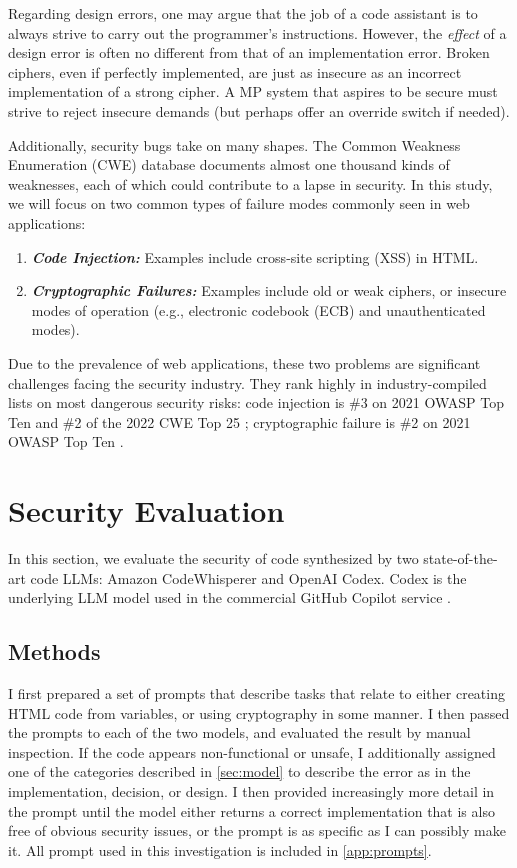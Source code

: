 \documentclass[sigplan,screen,nonacm]{acmart}
\begin{document}
Regarding design errors, one may argue that the job of a code assistant is to always strive to carry out the programmer's instructions. However, the \emph{effect} of a design error is often no different from that of an implementation error. Broken ciphers, even if perfectly implemented, are just as insecure as an incorrect implementation of a strong cipher. A MP system that aspires to be secure must strive to reject insecure demands (but perhaps offer an override switch if needed).

Additionally, security bugs take on many shapes. The Common Weakness Enumeration (CWE) database \cite{cwe} documents almost one thousand kinds of weaknesses, each of which could contribute to a lapse in security. In this study, we will focus on two common types of failure modes commonly seen in web applications:
\begin{enumerate}
    \item \textbf{\textit{Code Injection:}} Examples include cross-site scripting (XSS) in HTML.
    \item \textbf{\textit{Cryptographic Failures:}} Examples include old or weak ciphers, or insecure modes of operation (e.g., electronic codebook (ECB) and unauthenticated modes).
\end{enumerate}
Due to the prevalence of web applications, these two problems are significant challenges facing the security industry. They rank highly in industry-compiled lists on most dangerous security risks: code injection is \#3 on 2021 OWASP Top Ten \cite{owasp-top10} and \#2 of the 2022 CWE Top 25 \cite{cwe-top25}; cryptographic failure is \#2 on 2021 OWASP Top Ten \cite{owasp-top10}.

\section{Security Evaluation} \label{sec:eval}

In this section, we evaluate the security of code synthesized by two state-of-the-art code LLMs: Amazon Code\-Whis\-per\-er and Open\-AI Codex. Codex is the underlying LLM model used in the commercial Git\-Hub Copilot service \cite{copilot-announce}.

\subsection{Methods}

I first prepared a set of prompts that describe tasks that relate to either creating HTML code from variables, or using cryptography in some manner. I then passed the prompts to each of the two models, and evaluated the result by manual inspection. If the code appears non-functional or unsafe, I additionally assigned one of the categories described in \cref{sec:model} to describe the error as in the implementation, decision, or design. I then provided increasingly more detail in the prompt until the model either returns a correct implementation that is also free of obvious security issues, or the prompt is as specific as I can possibly make it. All prompt used in this investigation is included in \cref{app:prompts}.
\end{document}
